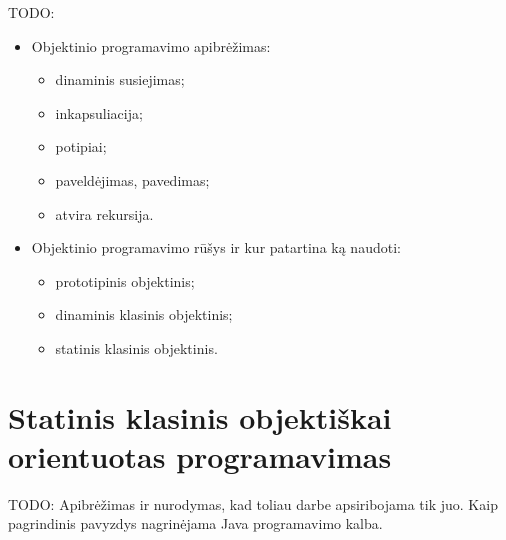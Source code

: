 TODO:
\begin{itemize}
  \item Objektinio programavimo apibrėžimas:
    \begin{itemize}
      \item dinaminis susiejimas;
      \item inkapsuliacija;
      \item potipiai;
      \item paveldėjimas, pavedimas;
      \item atvira rekursija.
    \end{itemize}
  \item Objektinio programavimo rūšys ir kur patartina ką naudoti:
    \begin{itemize}
      \item prototipinis objektinis;
      \item dinaminis klasinis objektinis;
      \item statinis klasinis objektinis.
    \end{itemize}
\end{itemize}

\section{Statinis klasinis objektiškai orientuotas programavimas}

TODO: Apibrėžimas ir nurodymas, kad toliau darbe apsiribojama tik juo.
Kaip pagrindinis pavyzdys nagrinėjama Java programavimo kalba.
